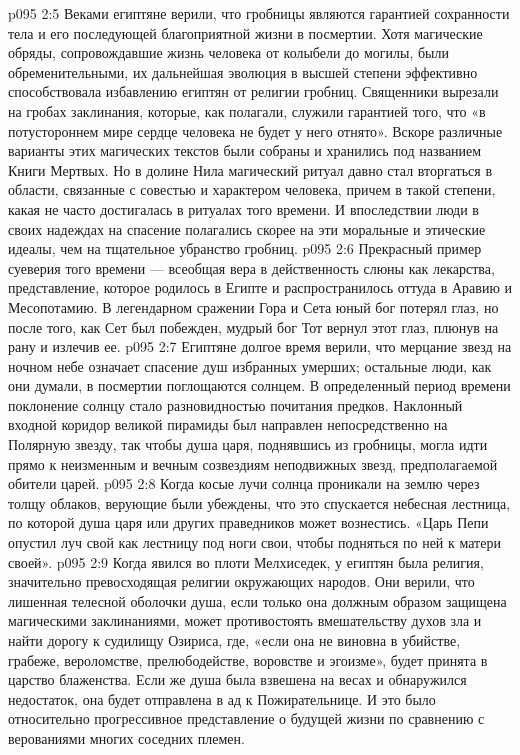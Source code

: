 \vs p095 2:5 Веками египтяне верили, что гробницы являются гарантией сохранности тела и его последующей благоприятной жизни в посмертии. Хотя магические обряды, сопровождавшие жизнь человека от колыбели до могилы, были обременительными, их дальнейшая эволюция в высшей степени эффективно способствовала избавлению египтян от религии гробниц. Священники вырезали на гробах заклинания, которые, как полагали, служили гарантией того, что «в потустороннем мире сердце человека не будет у него отнято». Вскоре различные варианты этих магических текстов были собраны и хранились под названием Книги Мертвых. Но в долине Нила магический ритуал давно стал вторгаться в области, связанные с совестью и характером человека, причем в такой степени, какая не часто достигалась в ритуалах того времени. И впоследствии люди в своих надеждах на спасение полагались скорее на эти моральные и этические идеалы, чем на тщательное убранство гробниц.
\vs p095 2:6 \pc Прекрасный пример суеверия того времени --- всеобщая вера в действенность слюны как лекарства, представление, которое родилось в Египте и распространилось оттуда в Аравию и Месопотамию. В легендарном сражении Гора и Сета юный бог потерял глаз, но после того, как Сет был побежден, мудрый бог Тот вернул этот глаз, плюнув на рану и излечив ее.
\vs p095 2:7 \pc Египтяне долгое время верили, что мерцание звезд на ночном небе означает спасение душ избранных умерших; остальные люди, как они думали, в посмертии поглощаются солнцем. В определенный период времени поклонение солнцу стало разновидностью почитания предков. Наклонный входной коридор великой пирамиды был направлен непосредственно на Полярную звезду, так чтобы душа царя, поднявшись из гробницы, могла идти прямо к неизменным и вечным созвездиям неподвижных звезд, предполагаемой обители царей.
\vs p095 2:8 Когда косые лучи солнца проникали на землю через толщу облаков, верующие были убеждены, что это спускается небесная лестница, по которой душа царя или других праведников может вознестись. «Царь Пепи опустил луч свой как лестницу под ноги свои, чтобы подняться по ней к матери своей».
\vs p095 2:9 Когда явился во плоти Мелхиседек, у египтян была религия, значительно превосходящая религии окружающих народов. Они верили, что лишенная телесной оболочки душа, если только она должным образом защищена магическими заклинаниями, может противостоять вмешательству духов зла и найти дорогу к судилищу Озириса, где, «если она не виновна в убийстве, грабеже, вероломстве, прелюбодействе, воровстве и эгоизме», будет принята в царство блаженства. Если же душа была взвешена на весах и обнаружился недостаток, она будет отправлена в ад к Пожирательнице. И это было относительно прогрессивное представление о будущей жизни по сравнению с верованиями многих соседних племен.
